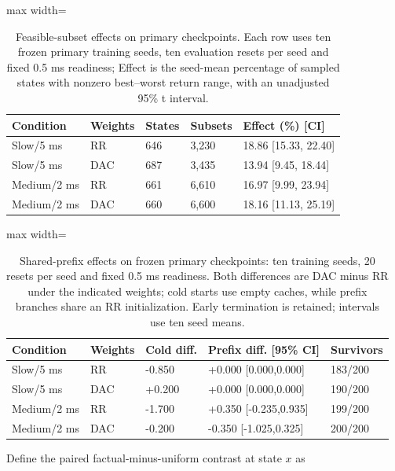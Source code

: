 \documentclass[11pt,a4paper]{article}
\begin{document}
\begin{table}[htbp]\centering\setlength{\tabcolsep}{3pt}\footnotesize
\caption{Feasible-subset effects on primary checkpoints. Each row uses ten frozen primary training seeds, ten evaluation resets per seed and fixed 0.5 ms readiness; Effect is the seed-mean percentage of sampled states with nonzero best--worst return range, with an unadjusted 95\% t interval.}\label{tab:new_fresh}
\vspace{3mm}
\begin{adjustbox}{max width=\linewidth}\begin{tabular}{lllll}\toprule
Condition & Weights & States & Subsets & Effect (\%) [CI]\\\midrule
Slow/5 ms & RR & 646 & 3,230 & 18.86 [15.33, 22.40]\\
Slow/5 ms & DAC & 687 & 3,435 & 13.94 [9.45, 18.44]\\
Medium/2 ms & RR & 661 & 6,610 & 16.97 [9.99, 23.94]\\
Medium/2 ms & DAC & 660 & 6,600 & 18.16 [11.13, 25.19]\\
\bottomrule\end{tabular}\end{adjustbox}\end{table}
\begin{table}[htbp]\centering\setlength{\tabcolsep}{3pt}\footnotesize
\caption{Shared-prefix effects on frozen primary checkpoints: ten training seeds, 20 resets per seed and fixed 0.5 ms readiness. Both differences are DAC minus RR under the indicated weights; cold starts use empty caches, while prefix branches share an RR initialization. Early termination is retained; intervals use ten seed means.}\label{tab:new_prefix}
\begin{adjustbox}{max width=\linewidth}\begin{tabular}{lllll}\toprule
Condition & Weights & Cold diff. & Prefix diff. [95\% CI] & Survivors\\\midrule
Slow/5 ms & RR & -0.850 & +0.000 [0.000,0.000] & 183/200\\
Slow/5 ms & DAC & +0.200 & +0.000 [0.000,0.000] & 190/200\\
Medium/2 ms & RR & -1.700 & +0.350 [-0.235,0.935] & 199/200\\
Medium/2 ms & DAC & -0.200 & -0.350 [-1.025,0.325] & 200/200\\
\bottomrule\end{tabular}\end{adjustbox}\end{table}
Define the paired factual-minus-uniform contrast at state $x$ as
\end{document}

